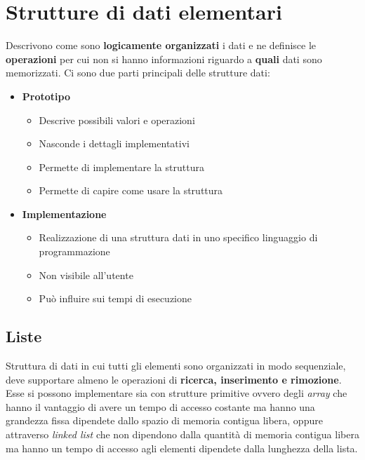 \documentclass{article}
\begin{document}
\section{Strutture di dati elementari}
Descrivono come sono \textbf{logicamente organizzati} i dati e ne definisce le \textbf{operazioni} per cui non si hanno informazioni riguardo a \textbf{quali} dati sono memorizzati.
Ci sono due parti principali delle strutture dati:
\begin{itemize}
    \item \textbf{Prototipo} \begin{itemize}
        \item Descrive possibili valori e operazioni
        \item Nasconde i dettagli implementativi
        \item Permette di implementare la struttura
        \item Permette di capire come usare la struttura
    \end{itemize}
    \item \textbf{Implementazione} \begin{itemize}
        \item Realizzazione di una struttura dati in uno specifico linguaggio di programmazione
        \item Non visibile all'utente
        \item Può influire sui tempi di esecuzione
    \end{itemize}
\end{itemize}

\subsection{Liste}
Struttura di dati in cui tutti gli elementi sono organizzati in modo sequenziale, deve supportare almeno le operazioni di \textbf{ricerca, inserimento e rimozione}. 
Esse si possono implementare sia con strutture primitive ovvero degli \textit{array} che hanno il vantaggio di avere un tempo di accesso costante ma hanno una grandezza fissa dipendete dallo spazio di memoria contigua libera, 
oppure attraverso \textit{linked list} che non dipendono dalla quantità di memoria contigua libera ma hanno un tempo di accesso agli elementi dipendete dalla lunghezza della lista.
\end{document}
